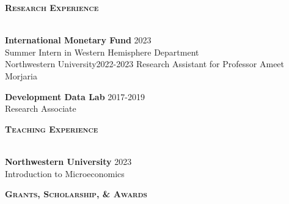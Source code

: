\documentclass[11pt]{article}
\newcommand{\lineunder}{\vspace*{-8pt} \\ \hspace*{-18pt} \hrulefill \\}
\newcommand{\header}[1]{{\hspace*{-15pt}\vspace*{6pt} \textsc{#1}} \vspace*{-6pt} \lineunder}
\newcommand{\schoolwithcourses}[4]{
 \textbf{#1} \hfill{#2}\\
    #3\\
\vspace*{5pt}
}
\begin{document}



\header{\textbf{Research Experience}}
\vspace{2mm}
\schoolwithcourses{International Monetary Fund}{2023}{\hspace{2mm} Summer Intern in Western Hemisphere Department}

\schoolwithcourses{Northwestern University}{2022-2023}{\hspace{2mm} Research Assistant for Professor Ameet Morjaria}

\schoolwithcourses{Development Data Lab}{2017-2019}{\hspace{2mm} Research Associate}
\hfill{}
\vspace{3mm}


\header{\textbf{Teaching Experience}}
\vspace{2mm}
\schoolwithcourses{Northwestern University}{2023}{\hspace{2mm} Introduction to Microeconomics}
\hfill{}
\vspace{3mm}


\header{\textbf{Grants, Scholarship, \& Awards}}
\vspace{2mm}
\end{document}
